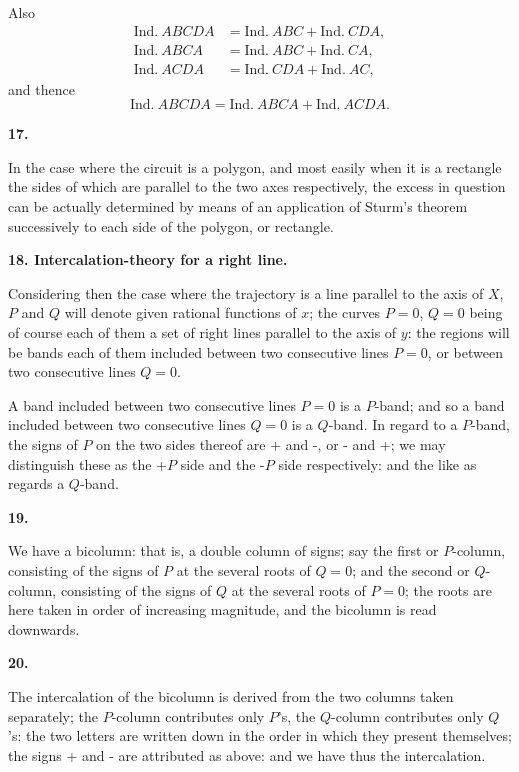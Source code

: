 \documentclass[11pt,a4paper]{book}
\begin{document}
Also
\begin{align*}
\text{Ind.}\ ABCDA &= \text{Ind.}\ ABC + \text{Ind.}\ CDA,\\
\text{Ind.}\ ABCA &= \text{Ind.}\ ABC + \text{Ind.}\ CA,\\
\text{Ind.}\ ACDA &= \text{Ind.}\ CDA + \text{Ind.}\ AC,
\end{align*}
and thence
\[
\text{Ind.}\ ABCDA = \text{Ind.}\ ABCA + \text{Ind.}\ ACDA.
\]

\textbf{17.}

In the case where the circuit is a polygon, and most easily when it is a rectangle the sides of which are parallel to the two axes respectively, the excess in question can be actually determined by means of an application of Sturm's theorem successively to each side of the polygon, or rectangle.

\newpage
\setcounter{page}{28}

\textbf{18. Intercalation-theory for a right line.}

Considering then the case where the trajectory is a line parallel to the axis of $X$, $P$ and $Q$ will denote given rational functions of $x$; the curves $P = 0$, $Q = 0$ being of course each of them a set of right lines parallel to the axis of $y$: the regions will be bands each of them included between two consecutive lines $P = 0$, or between two consecutive lines $Q = 0$.

A band included between two consecutive lines $P = 0$ is a $P$-band; and so a band included between two consecutive lines $Q = 0$ is a $Q$-band. In regard to a $P$-band, the signs of $P$ on the two sides thereof are + and -, or - and +; we may distinguish these as the +$P$ side and the -$P$ side respectively: and the like as regards a $Q$-band.

\textbf{19.}

We have a bicolumn: that is, a double column of signs; say the first or $P$-column, consisting of the signs of $P$ at the several roots of $Q = 0$; and the second or $Q$-column, consisting of the signs of $Q$ at the several roots of $P = 0$; the roots are here taken in order of increasing magnitude, and the bicolumn is read downwards.

\textbf{20.}

The intercalation of the bicolumn is derived from the two columns taken separately; the $P$-column contributes only $P$'s, the $Q$-column contributes only $Q$'s: the two letters are written down in the order in which they present themselves; the signs + and - are attributed as above: and we have thus the intercalation.
\end{document}
